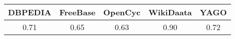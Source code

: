 \begin{table}[t]
\centering
\begin{minipage}{0.95\columnwidth}
\centering
\caption{}
\begin{tabular}{ccccc} \hline
DBPEDIA & FreeBase & OpenCyc & WikiDaata & YAGO
\\ \hline
0.71 & 0.65 & 0.63 & 0.90 & 0.72
\\ \hline
\end{tabular}
\label{table:fulfillment_degree}
\end{minipage}
\end{table}